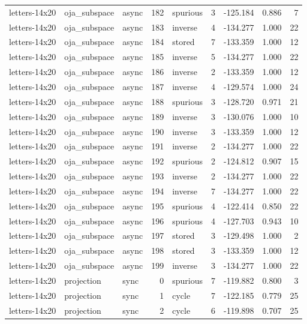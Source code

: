 \begin{tabular}{lllrlrrrr}
letters-14x20 & oja\_subspace & async & 182 & spurious & 3 & -125.184 & 0.886 & 7 \\
letters-14x20 & oja\_subspace & async & 183 & inverse & 4 & -134.277 & 1.000 & 22 \\
letters-14x20 & oja\_subspace & async & 184 & stored & 7 & -133.359 & 1.000 & 12 \\
letters-14x20 & oja\_subspace & async & 185 & inverse & 5 & -134.277 & 1.000 & 22 \\
letters-14x20 & oja\_subspace & async & 186 & inverse & 2 & -133.359 & 1.000 & 12 \\
letters-14x20 & oja\_subspace & async & 187 & inverse & 4 & -129.574 & 1.000 & 24 \\
letters-14x20 & oja\_subspace & async & 188 & spurious & 3 & -128.720 & 0.971 & 21 \\
letters-14x20 & oja\_subspace & async & 189 & inverse & 3 & -130.076 & 1.000 & 10 \\
letters-14x20 & oja\_subspace & async & 190 & inverse & 3 & -133.359 & 1.000 & 12 \\
letters-14x20 & oja\_subspace & async & 191 & inverse & 2 & -134.277 & 1.000 & 22 \\
letters-14x20 & oja\_subspace & async & 192 & spurious & 2 & -124.812 & 0.907 & 15 \\
letters-14x20 & oja\_subspace & async & 193 & inverse & 2 & -134.277 & 1.000 & 22 \\
letters-14x20 & oja\_subspace & async & 194 & inverse & 7 & -134.277 & 1.000 & 22 \\
letters-14x20 & oja\_subspace & async & 195 & spurious & 4 & -122.414 & 0.850 & 22 \\
letters-14x20 & oja\_subspace & async & 196 & spurious & 4 & -127.703 & 0.943 & 10 \\
letters-14x20 & oja\_subspace & async & 197 & stored & 3 & -129.498 & 1.000 & 2 \\
letters-14x20 & oja\_subspace & async & 198 & stored & 3 & -133.359 & 1.000 & 12 \\
letters-14x20 & oja\_subspace & async & 199 & inverse & 3 & -134.277 & 1.000 & 22 \\
letters-14x20 & projection & sync & 0 & spurious & 7 & -119.882 & 0.800 & 3 \\
letters-14x20 & projection & sync & 1 & cycle & 7 & -122.185 & 0.779 & 25 \\
letters-14x20 & projection & sync & 2 & cycle & 6 & -119.898 & 0.707 & 25 \\

\end{tabular}
